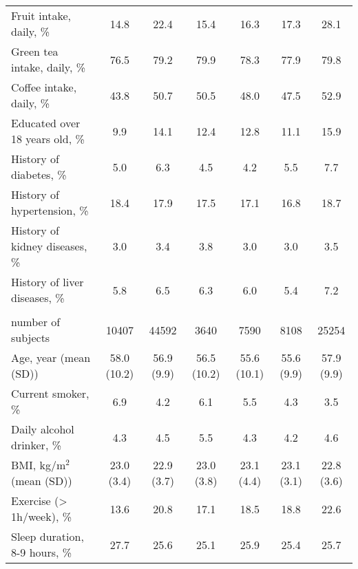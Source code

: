 \documentclass[nutrients,article,submitted,moreauthors,pdftex]{mdpi}
\begin{document}
\begin{table}[h]
{\begin{tabular}[t]{lcccccc}
\rowcolor{gray!6}  \hspace{1em}Fruit intake, daily, \% & 14.8 & 22.4 & 15.4 & 16.3 & 17.3 & 28.1\\
\hspace{1em}Green tea intake, daily, \% & 76.5 & 79.2 & 79.9 & 78.3 & 77.9 & 79.8\\
\rowcolor{gray!6}  \hspace{1em}Coffee intake, daily, \% & 43.8 & 50.7 & 50.5 & 48.0 & 47.5 & 52.9\\
\hspace{1em}Educated over 18 years old, \% & 9.9 & 14.1 & 12.4 & 12.8 & 11.1 & 15.9 \\
\rowcolor{gray!6}  \hspace{1em}History of diabetes, \% & 5.0 & 6.3 & 4.5 & 4.2 & 5.5 & 7.7\\
\hspace{1em}History of hypertension, \% & 18.4 & 17.9 & 17.5 & 17.1 & 16.8 & 18.7\\
\rowcolor{gray!6}  \hspace{1em}History of kidney diseases, \% & 3.0 & 3.4 & 3.8 & 3.0 & 3.0 & 3.5\\
\hspace{1em}History of liver diseases, \% & 5.8 & 6.5 & 6.3 & 6.0 & 5.4 & 7.2\\
\rowcolor{gray!6}  \addlinespace[0.3em]
\multicolumn{7}{l}{\textbf{Women (n = 54999)}}\\
\hspace{1em}number of subjects & 10407 & 44592 & 3640 & 7590 & 8108 & 25254\\
\hspace{1em}Age, year (mean (SD)) & 58.0 (10.2) & 56.9 (9.9) & 56.5 (10.2) & 55.6 (10.1) & 55.6 (9.9) & 57.9 (9.9)\\
\rowcolor{gray!6}  \hspace{1em}Current smoker, \% & 6.9 & 4.2 & 6.1 & 5.5 & 4.3 & 3.5\\
\hspace{1em}Daily alcohol drinker, \% & 4.3 & 4.5 & 5.5 & 4.3 & 4.2 & 4.6\\
\rowcolor{gray!6}  \hspace{1em}BMI, kg/m$^2$ (mean (SD)) & 23.0 (3.4) & 22.9 (3.7) & 23.0 (3.8) & 23.1 (4.4) & 23.1 (3.1) & 22.8 (3.6)\\
\hspace{1em}Exercise (> 1h/week), \% & 13.6 & 20.8 & 17.1 & 18.5 & 18.8 & 22.6\\
\rowcolor{gray!6}  \hspace{1em}Sleep duration, 8-9 hours, \% & 27.7 & 25.6 & 25.1 & 25.9 & 25.4 & 25.7\\

\end{tabular}}
\end{table}
\end{document}
